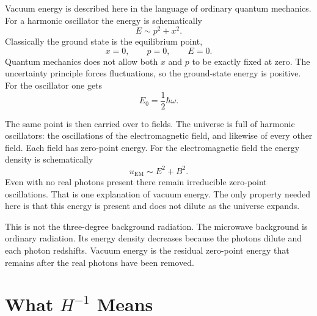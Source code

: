 Vacuum energy is described here in the language of ordinary quantum mechanics. For a harmonic oscillator the energy is schematically
\begin{equation}
E\sim p^2+x^2.
\end{equation}
Classically the ground state is the equilibrium point,
\begin{equation}
x=0,\qquad p=0,\qquad E=0.
\end{equation}
Quantum mechanics does not allow both \(x\) and \(p\) to be exactly fixed at zero. The uncertainty principle forces fluctuations, so the ground-state energy is positive. For the oscillator one gets
\begin{equation}
E_0=\frac{1}{2}\hbar\omega.
\end{equation}

The same point is then carried over to fields. The universe is full of harmonic oscillators: the oscillations of the electromagnetic field, and likewise of every other field. Each field has zero-point energy. For the electromagnetic field the energy density is schematically
\begin{equation}
u_{\mathrm{EM}}\sim E^2+B^2.
\end{equation}
Even with no real photons present there remain irreducible zero-point oscillations. That is one explanation of vacuum energy. The only property needed here is that this energy is present and does not dilute as the universe expands.

\begin{classroomqa}
\end{classroomqa}

This is not the three-degree background radiation. The microwave background is ordinary radiation. Its energy density decreases because the photons dilute and each photon redshifts. Vacuum energy is the residual zero-point energy that remains after the real photons have been removed.

\section{What \(H^{-1}\) Means}

